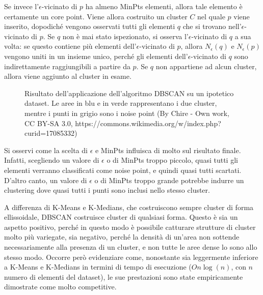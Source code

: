 \documentclass[a4paper, 12pt]{report}
\begin{document}
				Se invece l'$\epsilon$-vicinato di $p$ ha almeno MinPts
				elementi, allora tale elemento è certamente un core point.
				Viene allora costruito un cluster $C$ nel quale $p$ viene
				inserito, dopodiché vengono osservati tutti gli elementi
				$q$ che si trovano nell'$\epsilon$-vicinato di $p$.
				Se $q$ non è mai stato ispezionato, si osserva
				l'$\epsilon$-vicinato di $q$ a sua volta: se questo
				contiene più elementi dell'$\epsilon$-vicinato di $p$,
				allora $N_{\epsilon}(q)$ e $N_{\epsilon}(p)$ vengono
				uniti in un insieme unico, perché gli elementi
				dell'$\epsilon$-vicinato di $q$ sono indirettamente
				raggiungibili a partire da $p$. Se $q$ non appartiene
				ad alcun cluster, allora viene aggiunto al cluster in esame.

				\begin{figure}[H]
					\centering
					
					\caption{Risultato dell'applicazione dell'algoritmo DBSCAN su un
					ipotetico dataset. Le aree in blu e in verde rappresentano i due
					cluster, mentre i punti in grigio sono i noise point (By Chire -
					Own work, CC BY-SA 3.0, https://commons.wikimedia.org/w/index.php?curid=17085332)}
					\label{fig:dbscan-density-data}
				\end{figure}

				Si osservi come la scelta di $\epsilon$ e MinPts influisca di molto
				sul risultato finale. Infatti, scegliendo un valore di $\epsilon$ o
				di MinPts troppo piccolo, quasi tutti gli elementi verranno classificati
				come noise point, e quindi quasi tutti scartati. D'altro canto, un valore
				di $\epsilon$ o di MinPts troppo grande potrebbe indurre un clustering
				dove quasi tutti i punti sono inclusi nello stesso cluster.

				A differenza di K-Means e K-Medians, che costruiscono sempre cluster
				di forma ellissoidale, DBSCAN costruisce cluster di qualsiasi forma.
				Questo è sia un aspetto positivo, perché in questo modo è possibile
				catturare strutture di cluster molto più variegate, sia negativo,
				perché la densità di un'area non sottende necessariamente alla
				presenza di un cluster, e non tutte le aree dense lo sono allo
				stesso modo. Occorre però evidenziare come, nonostante sia leggermente
				inferiore a K-Means e K-Medians in termini di tempo di esecuzione
				($O n \log(n)$, con $n$ numero di elementi del dataset), le sue
				prestazioni sono state empiricamente dimostrate come molto competitive.
\end{document}

